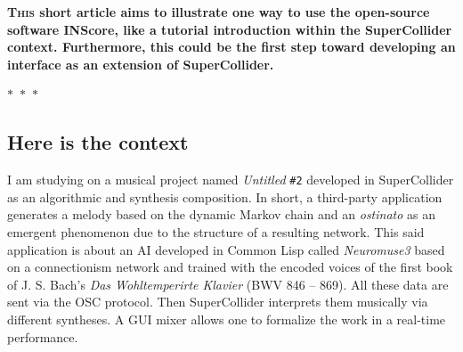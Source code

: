 \documentclass{article}
\begin{document}



\bfseries
\lettrine[lhang=.03]{T}{his} short article aims to illustrate one way to use the open-source software INScore, like a tutorial introduction within the SuperCollider context. Furthermore, this could be the first step toward developing an interface as an extension of SuperCollider.

 \mdseries
 \smallskip
%

\begin{center}
  $\ast$~$\ast$~$\ast$
\end{center}

\subsection*{Here is the context}
I am studying on a musical project named \textit{Untitled} \texttt{\#2} developed in SuperCollider as an algorithmic and synthesis composition. In short,
a third-party application generates a melody based on the dynamic Markov chain and an \textit{ostinato} as an emergent phenomenon due to the structure of a resulting network. This said application is about an AI developed in Common Lisp called \textsl{Neuromuse3} based on a connectionism network and trained with the encoded voices of the first book of J. S. Bach’s \textit{Das Wohltemperirte Klavier} (BWV 846 – 869). All these data are sent via the OSC protocol. Then SuperCollider interprets them musically via different syntheses. A GUI mixer allows one to formalize the work in a real-time performance. 
\end{document}
